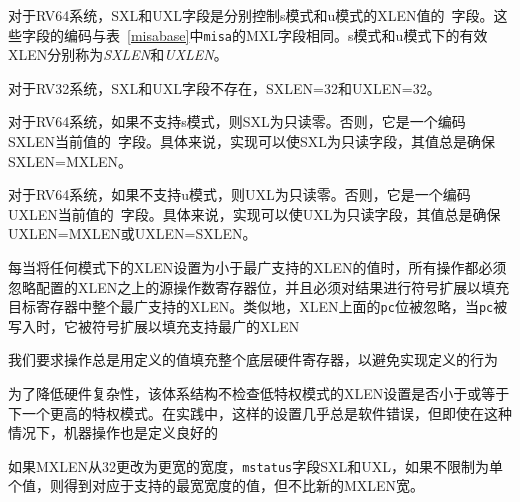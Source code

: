 对于RV64系统，SXL和UXL字段是分别控制s模式和u模式的XLEN值的\warl\ 字段。这些字段的编码与表~\ref{misabase}中{\tt misa}的MXL字段相同。s模式和u模式下的有效XLEN分别称为{\em SXLEN}和{\em UXLEN}。

对于RV32系统，SXL和UXL字段不存在，SXLEN=32和UXLEN=32。

对于RV64系统，如果不支持s模式，则SXL为只读零。否则，它是一个编码SXLEN当前值的\warl\ 字段。具体来说，实现可以使SXL为只读字段，其值总是确保SXLEN=MXLEN。

对于RV64系统，如果不支持u模式，则UXL为只读零。否则，它是一个编码UXLEN当前值的\warl\ 字段。具体来说，实现可以使UXL为只读字段，其值总是确保UXLEN=MXLEN或UXLEN=SXLEN。

每当将任何模式下的XLEN设置为小于最广支持的XLEN的值时，所有操作都必须忽略配置的XLEN之上的源操作数寄存器位，并且必须对结果进行符号扩展以填充目标寄存器中整个最广支持的XLEN。类似地，XLEN上面的{\tt pc}位被忽略，当{\tt pc}被写入时，它被符号扩展以填充支持最广的XLEN

\iffalse
\begin{commentary}
We require that operations always fill the entire underlying hardware
registers with defined values to avoid implementation-defined
behavior.

To reduce hardware complexity, the architecture imposes no checks that
lower-privilege modes have XLEN settings less than or equal to the
next-higher privilege mode.  In practice, such settings would almost
always be a software bug, but machine operation is well-defined even in this
case.
\end{commentary}
\fi


\begin{commentary}
我们要求操作总是用定义的值填充整个底层硬件寄存器，以避免实现定义的行为

为了降低硬件复杂性，该体系结构不检查低特权模式的XLEN设置是否小于或等于下一个更高的特权模式。在实践中，这样的设置几乎总是软件错误，但即使在这种情况下，机器操作也是定义良好的
\end{commentary}

\iffalse
If MXLEN is changed from 32 to a wider width, each of {\tt mstatus} fields SXL and
UXL, if not restricted to a single value, gets the value corresponding to the
widest supported width not wider than the new MXLEN.
\fi

如果MXLEN从32更改为更宽的宽度，{\tt mstatus}字段SXL和UXL，如果不限制为单个值，则得到对应于支持的最宽宽度的值，但不比新的MXLEN宽。

